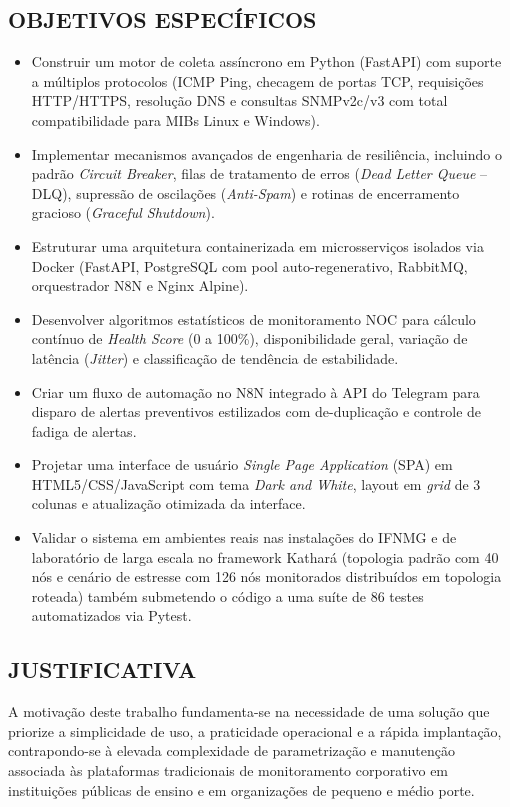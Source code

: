\documentclass[12pt,a4paper]{article}
\begin{document}
\subsection{OBJETIVOS ESPECÍFICOS}
\begin{itemize}[leftmargin=1.25cm]
\item Construir um motor de coleta assíncrono em Python (FastAPI) com suporte a múltiplos protocolos (ICMP Ping, checagem de portas TCP, requisições HTTP/HTTPS, resolução DNS e consultas SNMPv2c/v3 com total compatibilidade para MIBs Linux e Windows).
\item Implementar mecanismos avançados de engenharia de resiliência, incluindo o padrão \textit{Circuit Breaker}, filas de tratamento de erros (\textit{Dead Letter Queue} -- DLQ), supressão de oscilações (\textit{Anti-Spam}) e rotinas de encerramento gracioso (\textit{Graceful Shutdown}).
\item Estruturar uma arquitetura containerizada em microsserviços isolados via Docker (FastAPI, PostgreSQL com pool auto-regenerativo, RabbitMQ, orquestrador N8N e Nginx Alpine).
\item Desenvolver algoritmos estatísticos de monitoramento NOC para cálculo contínuo de \textit{Health Score} (0 a 100\%), disponibilidade geral, variação de latência (\textit{Jitter}) e classificação de tendência de estabilidade.
\item Criar um fluxo de automação no N8N integrado à API do Telegram para disparo de alertas preventivos estilizados com de-duplicação e controle de fadiga de alertas.
\item Projetar uma interface de usuário \textit{Single Page Application} (SPA) em HTML5/CSS/JavaScript com tema \textit{Dark and White}, layout em \textit{grid} de 3 colunas e atualização otimizada da interface.
\item Validar o sistema em ambientes reais nas instalações do IFNMG e de laboratório de larga escala no framework Kathará (topologia padrão com 40 nós e cenário de estresse com 126 nós monitorados distribuídos em topologia roteada) também submetendo o código a uma suíte de 86 testes automatizados via Pytest.
\end{itemize}

\subsection{JUSTIFICATIVA}
A motivação deste trabalho fundamenta-se na necessidade de uma solução que priorize a simplicidade de uso, a praticidade operacional e a rápida implantação, contrapondo-se à elevada complexidade de parametrização e manutenção associada às plataformas tradicionais de monitoramento corporativo em instituições públicas de ensino e em organizações de pequeno e médio porte.
\end{document}
